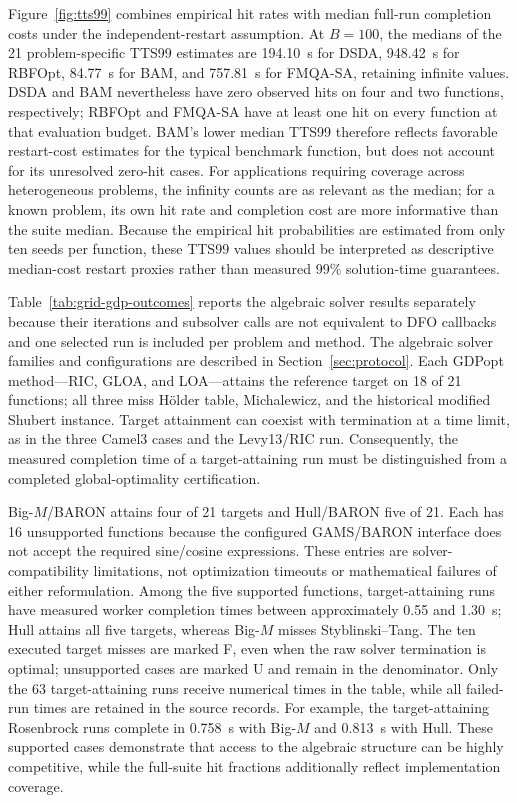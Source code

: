 \documentclass{article}
\begin{document}
Figure~\ref{fig:tts99} combines empirical hit rates with median full-run completion costs under the independent-restart assumption.
At $B=100$, the medians of the 21 problem-specific TTS99 estimates are 194.10~s for DSDA, 948.42~s for RBFOpt, 84.77~s for BAM, and 757.81~s for FMQA-SA, retaining infinite values.
DSDA and BAM nevertheless have zero observed hits on four and two functions, respectively; RBFOpt and FMQA-SA have at least one hit on every function at that evaluation budget.
BAM's lower median TTS99 therefore reflects favorable restart-cost estimates for the typical benchmark function, but does not account for its unresolved zero-hit cases.
For applications requiring coverage across heterogeneous problems, the infinity counts are as relevant as the median; for a known problem, its own hit rate and completion cost are more informative than the suite median.
Because the empirical hit probabilities are estimated from only ten seeds per function, these TTS99 values should be interpreted as descriptive median-cost restart proxies rather than measured 99\% solution-time guarantees.

Table~\ref{tab:grid-gdp-outcomes} reports the algebraic solver results separately because their iterations and subsolver calls are not equivalent to DFO callbacks and one selected run is included per problem and method.
The algebraic solver families and configurations are described in Section~\ref{sec:protocol}.
Each GDPopt method---RIC, GLOA, and LOA---attains the reference target on 18 of 21 functions; all three miss H\"older table, Michalewicz, and the historical modified Shubert instance.
Target attainment can coexist with termination at a time limit, as in the three Camel3 cases and the Levy13/RIC run.
Consequently, the measured completion time of a target-attaining run must be distinguished from a completed global-optimality certification.

Big-\(M\)/BARON attains four of 21 targets and Hull/BARON five of 21.
Each has 16 unsupported functions because the configured GAMS/BARON interface does not accept the required sine/cosine expressions.
These entries are solver-compatibility limitations, not optimization timeouts or mathematical failures of either reformulation.
Among the five supported functions, target-attaining runs have measured worker completion times between approximately 0.55 and 1.30~s; Hull attains all five targets, whereas Big-\(M\) misses Styblinski--Tang.
The ten executed target misses are marked F, even when the raw solver termination is optimal; unsupported cases are marked U and remain in the denominator.
Only the 63 target-attaining runs receive numerical times in the table, while all failed-run times are retained in the source records.
For example, the target-attaining Rosenbrock runs complete in 0.758~s with Big-\(M\) and 0.813~s with Hull.
These supported cases demonstrate that access to the algebraic structure can be highly competitive, while the full-suite hit fractions additionally reflect implementation coverage.
\end{document}
